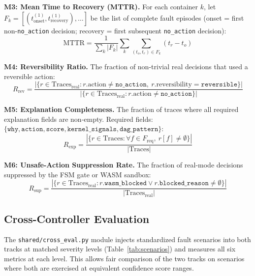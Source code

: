 \documentclass[runningheads]{llncs}
\begin{document}
\noindent\textbf{M3: Mean Time to Recovery (MTTR).}
For each container $k$, let $F_k = [(t^{(1)}_\text{onset},
t^{(1)}_\text{recovery}), \ldots]$ be the list of complete fault
episodes (onset = first non-\texttt{no\_action} decision;
recovery = first subsequent \texttt{no\_action} decision):
\begin{equation}
  \text{MTTR} = \frac{1}{\sum_k |F_k|} \sum_k \sum_{(t_o,t_r)\in F_k}
    (t_r - t_o)
  \label{eq:mttr}
\end{equation}

\noindent\textbf{M4: Reversibility Ratio.}
The fraction of non-trivial real decisions that used a reversible action:
\begin{equation}
  R_\text{rev} = \frac{|\{r \in \text{Traces}_\text{real} :
    r.\text{action} \neq \texttt{no\_action},\
    r.\text{reversibility} = \texttt{reversible}\}|}{
    |\{r \in \text{Traces}_\text{real} : r.\text{action} \neq \texttt{no\_action}\}|}
  \label{eq:rev}
\end{equation}

\noindent\textbf{M5: Explanation Completeness.}
The fraction of traces where all required explanation fields are
non-empty.  Required fields: $\{\texttt{why}, \texttt{action},
\texttt{score}, \texttt{kernel\_signals}, \texttt{dag\_pattern}\}$:
\begin{equation}
  R_\text{exp} = \frac{|\{r \in \text{Traces} :
    \forall f \in F_\text{req},\ r[f] \neq \emptyset\}|}{|\text{Traces}|}
  \label{eq:exp}
\end{equation}

\noindent\textbf{M6: Unsafe-Action Suppression Rate.}
The fraction of real-mode decisions suppressed by the FSM gate or
WASM sandbox:
\begin{equation}
  R_\text{sup} = \frac{|\{r \in \text{Traces}_\text{real} :
    r.\texttt{wasm\_blocked} \vee r.\texttt{blocked\_reason} \neq \emptyset\}|}{
    |\text{Traces}_\text{real}|}
  \label{eq:sup}
\end{equation}

\subsection{Cross-Controller Evaluation}

The \texttt{shared/cross\_eval.py} module injects standardized fault
scenarios into both tracks at matched severity levels (Table~\ref{tab:scenarios})
and measures all six metrics at each level.  This allows fair
comparison of the two tracks on scenarios where both are exercised
at equivalent confidence score ranges.
\end{document}

